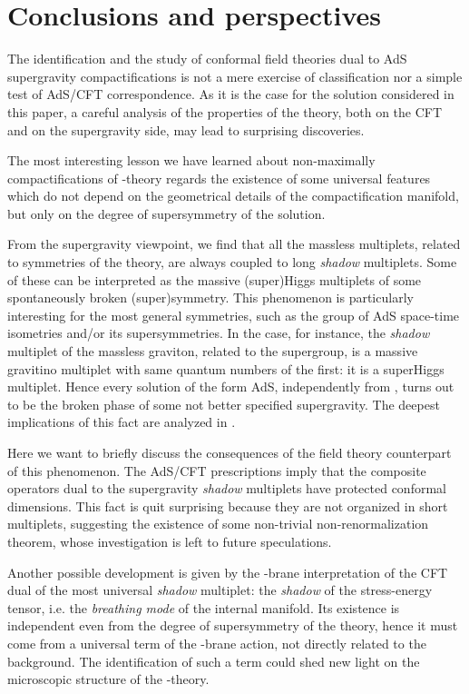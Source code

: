\documentclass[a4paper,12pt]{article}
\def\n010{N^{0,1,0}}
\begin{document}
\section{Conclusions and perspectives}
The identification and the study of conformal field theories dual to
AdS supergravity compactifications is not a mere exercise of
classification nor a simple test of AdS/CFT correspondence.
As it is the case for the \myHighlight{$\n010$}\coordHE{} solution considered in this paper, a
careful analysis of the properties of the theory, both on the CFT and
on the supergravity side, may lead to surprising discoveries.
\par
The most interesting lesson we have learned about non-maximally
compactifications of \coordHE{}-theory regards the existence of some
universal features which do not depend on the geometrical details of
the compactification manifold, but only on the degree of
supersymmetry of the solution.
\par
From the supergravity viewpoint, we find that all the massless
multiplets, related to symmetries of the theory, are always coupled
to long {\it shadow} multiplets.
Some of these can be interpreted as the massive (super)Higgs multiplets
of some spontaneously broken (super)symmetry.
This phenomenon is particularly interesting for the most general
symmetries, such as the group of AdS space-time isometries and/or
its supersymmetries.
In the \coordHE{} case, for instance, the {\it shadow} multiplet
of the massless graviton, related to the \coordHE{} supergroup,
is a massive gravitino multiplet with same quantum numbers of the
first: it is a superHiggs multiplet.
Hence every \coordHE{} solution of the form AdS\coordHE{},
independently from \coordHE{}, turns out to be the broken phase of some
not better specified \coordHE{} supergravity.
The deepest implications of this fact are analyzed in \cite{noinext}.
\par
Here we want to briefly discuss the consequences of the field theory
counterpart of this phenomenon.
The AdS/CFT prescriptions imply that the composite operators
dual to the supergravity {\it shadow} multiplets have protected
conformal dimensions.
This fact is quit surprising because they are not organized in short
multiplets, suggesting the existence of some non-trivial
non-renormalization theorem, whose investigation is left to future
speculations.
\par
Another possible development is given by the \coordHE{}-brane interpretation
of the CFT dual of the most universal {\it shadow} multiplet: the
{\it shadow} of the stress-energy tensor, i.e. the {\it breathing
mode} of the internal manifold.
Its existence is independent even from the degree of supersymmetry of
the theory, hence it must come from a universal term of the \coordHE{}-brane
action, not directly related to the background.
The identification of such a term could shed new light on the microscopic
structure of the \coordHE{}-theory.
\end{document}
